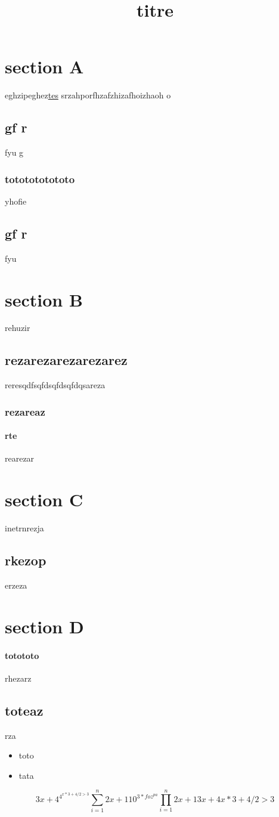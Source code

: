 \documentclass{article}
\title{titre}
\begin{document}
\maketitle
\section{section A}{eghzipeghez\underline{\color{red}tes}
srzahporfhzafzhizafhoizhaoh o\subsection{gf r}{fyu g\subsubsection{tototototototo}{yhofie}
} \subsection{gf r}{fyu}}

\section{section B}{rehuzir\subsection{rezarezarezarezarez}{reresqdfsqfds\color{red}qfdsqfdqsareza\subsubsection{rezareaz}{\paragraph{rte}{rearezar}}}}
	 	 \tableofcontents
\section{section C}{inetrnrezja\subsection{rkezop}{erzeza}}
\section{section D}{\paragraph{totototo}{rhezarz}\subsection{toteaz}{rza}}
\begin{itemize}
	 \item toto

	        \item tata    
\end{itemize}

\begin{equation}
3x+4^{4^{x*3+4/2 > 3}}
{\sum_{i=1 }^{n} 2x+1} 
10^{3*foz^{pa}}
{\prod_{i=1 }^{n} 2x+1}
3x+4x*3+4/2 > 3
\end{equation}
\end{document}
